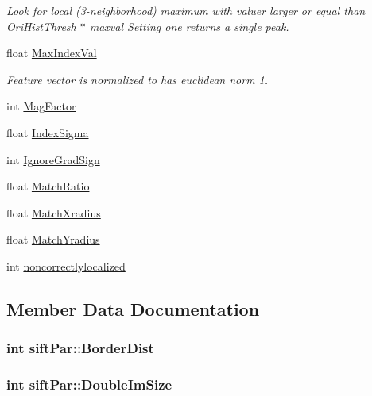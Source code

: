 \begin{DoxyCompactItemize}
\begin{DoxyCompactList}\small\item\em Look for local (3-\/neighborhood) maximum with valuer larger or equal than Ori\+Hist\+Thresh $\ast$ maxval Setting one returns a single peak. \end{DoxyCompactList}\item 
float \hyperlink{structsiftPar_ad2e4baf0901418c70017d26d9504f72b}{Max\+Index\+Val}
\begin{DoxyCompactList}\small\item\em Feature vector is normalized to has euclidean norm 1. \end{DoxyCompactList}\item 
int \hyperlink{structsiftPar_a109497281d3cf382c11f81ead9d5744a}{Mag\+Factor}
\item 
float \hyperlink{structsiftPar_aa1ae0de77021c85e664e5b67eb4fe1c0}{Index\+Sigma}
\item 
int \hyperlink{structsiftPar_a74aa42e8528fda1ed067d0592a4196c3}{Ignore\+Grad\+Sign}
\item 
float \hyperlink{structsiftPar_aa8720a4bdd0384b43952124af21d8406}{Match\+Ratio}
\item 
float \hyperlink{structsiftPar_a5592a6b75bffce553745a432dc057a90}{Match\+Xradius}
\item 
float \hyperlink{structsiftPar_aba2f2be641556c326a55c21b17b5acdd}{Match\+Yradius}
\item 
int \hyperlink{structsiftPar_ac2b95a0473b30122b503481b09ff2f05}{noncorrectlylocalized}
\end{DoxyCompactItemize}


\subsection{Member Data Documentation}
\hypertarget{structsiftPar_a5a14761eed5225db50538dfb72eef86d}{}
\subsubsection[{Border\+Dist}]{\setlength{\rightskip}{0pt plus 5cm}int sift\+Par\+::\+Border\+Dist}\label{structsiftPar_a5a14761eed5225db50538dfb72eef86d}
\hypertarget{structsiftPar_a1898a6265c02a51783bb522a24d5028d}{}
\subsubsection[{Double\+Im\+Size}]{\setlength{\rightskip}{0pt plus 5cm}int sift\+Par\+::\+Double\+Im\+Size}\label{structsiftPar_a1898a6265c02a51783bb522a24d5028d}
\hypertarget{structsiftPar_a37fe7d87b5ddf9a82156abebebc66b0f}{}
